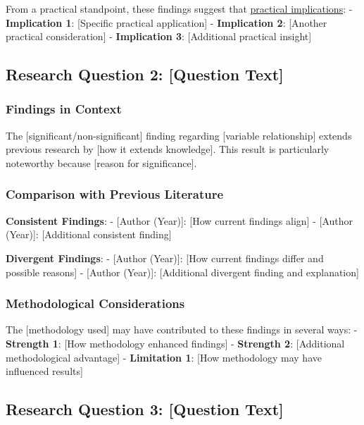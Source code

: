 \documentclass[
  12pt,
  letterpaper,
  12pt,
  letterpaper,
  oneside]{report}
\begin{document}
From a practical standpoint, these findings suggest that
\hyperref[practical-implications]{practical implications}: -
\textbf{Implication 1}: {[}Specific practical application{]} -
\textbf{Implication 2}: {[}Another practical consideration{]} -
\textbf{Implication 3}: {[}Additional practical insight{]}

\subsection{Research Question 2: {[}Question
Text{]}}\label{research-question-2-question-text-1}

\subsubsection{Findings in Context}\label{findings-in-context-1}

The {[}significant/non-significant{]} finding regarding {[}variable
relationship{]} extends previous research by {[}how it extends
knowledge{]}. This result is particularly noteworthy because {[}reason
for significance{]}.

\subsubsection{Comparison with Previous
Literature}\label{comparison-with-previous-literature}

\textbf{Consistent Findings}: - {[}Author (Year){]}: {[}How current
findings align{]} - {[}Author (Year){]}: {[}Additional consistent
finding{]}

\textbf{Divergent Findings}: - {[}Author (Year){]}: {[}How current
findings differ and possible reasons{]} - {[}Author (Year){]}:
{[}Additional divergent finding and explanation{]}

\subsubsection{Methodological
Considerations}\label{methodological-considerations-1}

The {[}methodology used{]} may have contributed to these findings in
several ways: - \textbf{Strength 1}: {[}How methodology enhanced
findings{]} - \textbf{Strength 2}: {[}Additional methodological
advantage{]} - \textbf{Limitation 1}: {[}How methodology may have
influenced results{]}

\subsection{Research Question 3: {[}Question
Text{]}}\label{research-question-3-question-text-1}
\end{document}
